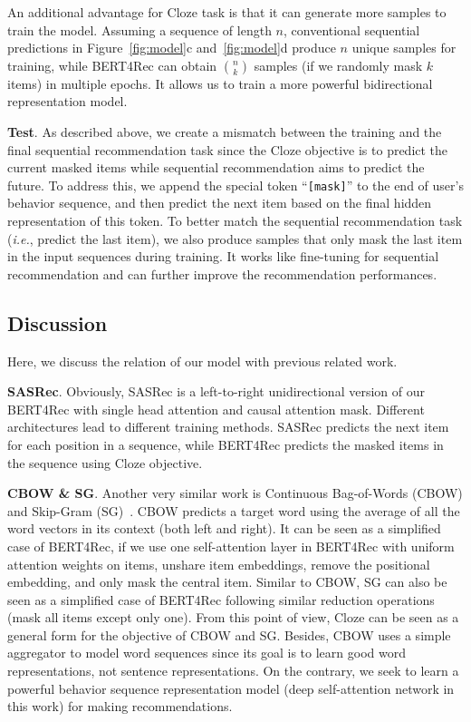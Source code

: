 An additional advantage for Cloze task is that it can generate more samples to train the model. Assuming a sequence of length $n$, conventional sequential predictions in Figure~\ref{fig:model}c and~\ref{fig:model}d  produce $n$ unique samples for training, while BERT4Rec can obtain $\binom{n}{k}$ samples (if we randomly mask $k$ items) in multiple epochs. It allows us to train a more powerful bidirectional representation model.

\textbf{Test}.
As described above, we create a mismatch between the training and the final sequential recommendation task since the Cloze objective is to predict the current masked items while sequential recommendation aims to predict the future. To address this, we append the special token ``\texttt{[mask]}'' to the end of user's behavior sequence, and then predict the next item based on the final hidden representation of this token. To better match the sequential recommendation task (\textit{i.e.}, predict the last item), we also produce samples that only mask the last item in the input sequences during training. It works like fine-tuning for sequential recommendation and can further improve the recommendation performances.

\subsection{Discussion}

Here, we discuss the relation of our model with previous related work.

\textbf{SASRec}. Obviously, SASRec is a left-to-right unidirectional version of our BERT4Rec with single head attention and causal attention mask. Different architectures lead to different training methods. SASRec predicts the next item for each position in a sequence, while BERT4Rec predicts the masked items in the sequence using Cloze objective.

\textbf{CBOW \& SG}. Another very similar work is Continuous Bag-of-Words (CBOW) and Skip-Gram (SG)~\cite{Mikolov:cbow}. CBOW predicts a target word using the average of all the word vectors in its context (both left and right). It can be seen as a simplified case of BERT4Rec, if we use one self-attention layer in BERT4Rec with uniform attention weights on items, unshare item embeddings, remove the positional embedding, and only mask the central item. Similar to CBOW, SG can also be seen as a simplified case of BERT4Rec following similar reduction operations (mask all items except only one). From this point of view, Cloze can be seen as a general form for the objective of CBOW and SG. Besides, CBOW uses a simple aggregator to model word sequences since its goal is to learn good word representations, not sentence representations. On the contrary, we seek to learn a powerful behavior sequence representation model (deep self-attention network in this work) for making recommendations.

